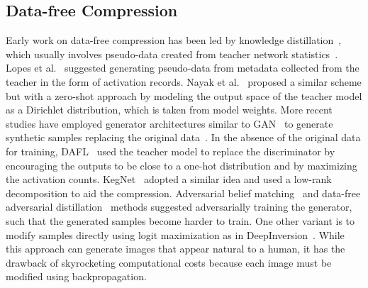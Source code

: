 \documentclass{article}
\newcommand{\KH}[1]{{\color{purple}[\textbf{\sc KH}: \textit{#1}]}}
\renewcommand{\KH}[1]{}
\begin{document}
\subsection{Data-free Compression}
Early work on data-free compression has been led by knowledge distillation~\cite{hinton2015distilling}, 
which usually involves pseudo-data created from teacher network statistics~\cite{lopes2017data, nayak2019zero}.
Lopes et al.~\cite{lopes2017data} suggested generating pseudo-data from metadata collected from the teacher in the form of activation records. 
Nayak et al.~\cite{nayak2019zero} proposed a similar scheme but with a zero-shot approach by modeling the output space of the teacher model as a Dirichlet distribution, which is taken from model weights.
More recent studies have employed generator architectures similar to GAN~\cite{gan} to generate synthetic samples replacing the original data~\cite{chen2019data, micaelli2019zero, fang2019data, yin2020dreaming}. \KH{deepdream is not using generator}
In the absence of the original data for training, DAFL~\cite{chen2019data} used the teacher model to replace the discriminator by encouraging the outputs to be close to a one-hot distribution and by maximizing the activation counts.
KegNet~\cite{kegnet} adopted a similar idea and used a low-rank decomposition to aid the compression.
Adversarial belief matching~\cite{micaelli2019zero} and data-free adversarial distillation~\cite{fang2019data} methods suggested adversarially training the generator, such that the generated samples become harder to train.
One other variant is to modify samples directly using logit maximization as in DeepInversion~\cite{yin2020dreaming}.
While this approach can generate images that appear natural to a human, it has the drawback of skyrocketing computational costs because each image must be modified using backpropagation.
\end{document}
